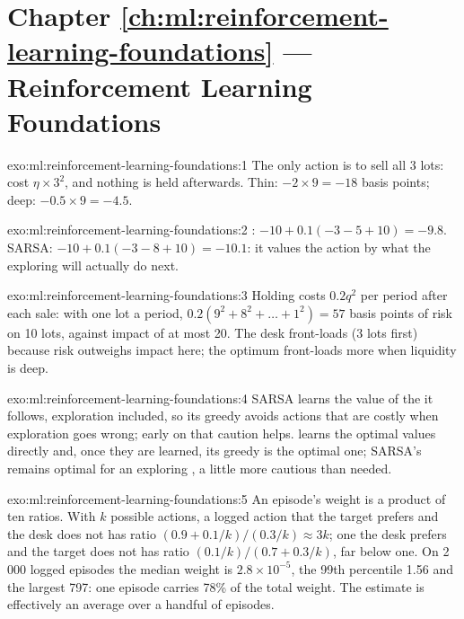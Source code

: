 \section*{Chapter \ref{ch:ml:reinforcement-learning-foundations} --- Reinforcement Learning Foundations}

\begin{solution}{exo:ml:reinforcement-learning-foundations:1}
The only action is to sell all 3 lots: cost $\eta\times3^2$, and nothing is held afterwards. Thin: $-2\times9 = -18$ basis
points; deep: $-0.5\times9 = -4.5$.
\end{solution}

\begin{solution}{exo:ml:reinforcement-learning-foundations:2}
: $-10 + 0.1(-3 - 5 + 10) = -9.8$. SARSA: $-10 + 0.1(-3 - 8 + 10) = -10.1$: it values the action by what the
exploring  will actually do next.
\end{solution}

\begin{solution}{exo:ml:reinforcement-learning-foundations:3}
Holding costs $0.2q^2$ per period after each sale: with one lot a period, $0.2(9^2 + 8^2 + \dots + 1^2) = 57$ basis points of
risk on 10 lots, against impact of at most 20. The desk front-loads (3 lots first) because risk outweighs impact here; the
optimum front-loads more when liquidity is deep.
\end{solution}

\begin{solution}{exo:ml:reinforcement-learning-foundations:4}
SARSA learns the value of the  it follows, exploration included, so its greedy  avoids actions that are costly
when exploration goes wrong; early on that caution helps.  learns the optimal values directly and, once they are
learned, its greedy  is the optimal one; SARSA's remains optimal for an exploring , a little more cautious than
needed.
\end{solution}

\begin{solution}{exo:ml:reinforcement-learning-foundations:5}
An episode's weight is a product of ten ratios. With $k$ possible actions, a logged action that the target prefers and
the desk does not has ratio $(0.9 + 0.1/k)/(0.3/k)\approx3k$; one the desk prefers and the target does not has ratio
$(0.1/k)/(0.7 + 0.3/k)$, far below one. On 2\,000 logged episodes the
median weight is $2.8\times10^{-5}$, the 99th percentile 1.56 and the largest 797: one episode carries 78\% of the total
weight. The estimate is effectively an average over a handful of episodes.
\end{solution}

